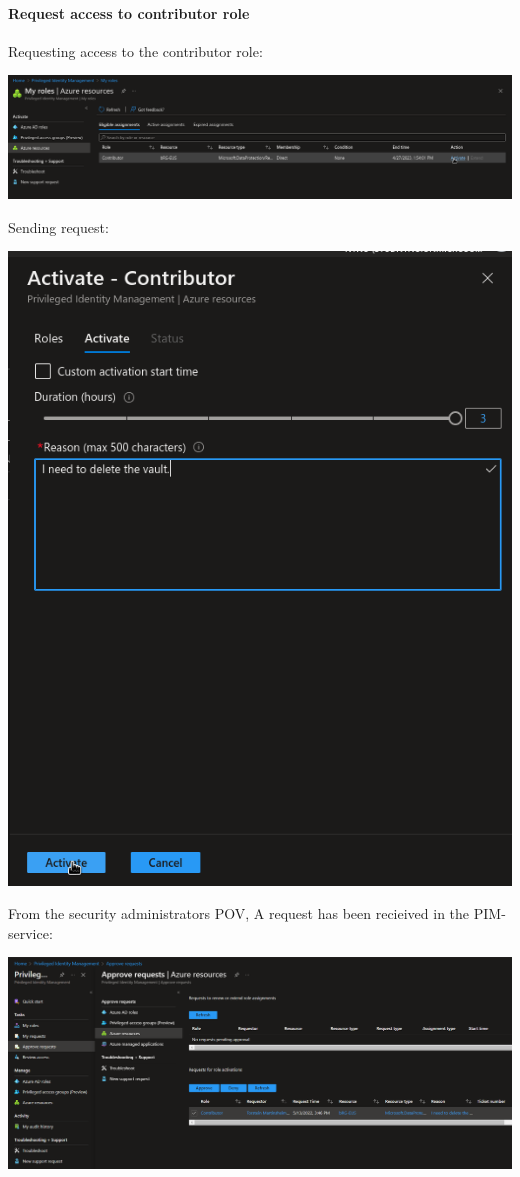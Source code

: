 \paragraph{Request access to contributor role}
\label{sec:orgec87294}
Requesting access to the contributor role:
\begin{center}
\includegraphics[width=.9\linewidth]{figures/mua/request_role.png}
\end{center}

Sending request:
\begin{center}
\includegraphics[width=.9\linewidth]{figures/mua/request_mua_role.png}
\end{center}

From the security administrators POV,
A request has been recieived in the PIM-service:

\includegraphics[width=.9\linewidth]{figures/mua/Request.PNG}

